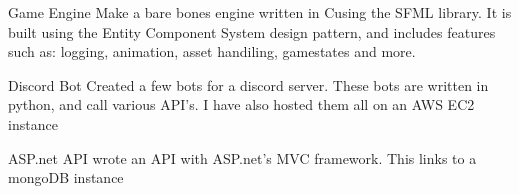 \documentclass[9pt]{developercv}
\newcommand{\CC}{C\nolinebreak\hspace{-.05em}\raisebox{.4ex}{\tiny\bf +}\nolinebreak\hspace{-.10em}\raisebox{.4ex}{\tiny\bf +}}
\def\CC{{C\nolinebreak[4]\hspace{-.05em}\raisebox{.4ex}{\tiny\bf ++}}}
\begin{document}
\begin{minipage}[t]{0.6\textwidth}
\begin{entrylist}
		\end{entrylist}
		\begin{entrylist}
			\entry
				{\vphantom{1.0}}
				{Game Engine}
				{}
				{Make a bare bones engine written in \CC using the SFML library. It is built using the Entity Component System design pattern, and includes features such as: logging, animation, asset handiling, gamestates and more.}
		\end{entrylist}
		\begin{entrylist}
			\entry
				{\vphantom{1.0}}
				{Discord Bot}
				{}
				{Created a few bots for a discord server. These bots are written in python, and call various API's. I have also hosted them all on an AWS EC2 instance}
		\end{entrylist}
		\begin{entrylist}
			\entry
				{\vphantom{1.0}}
				{ASP.net API}
				{}
				{wrote an API with ASP.net's MVC framework. This links to a mongoDB instance}
		\end{entrylist}
	\end{minipage}
\begin{minipage}[t]{0.1\textwidth}
\hphantom{0.1}
\end{minipage}
\end{document}
